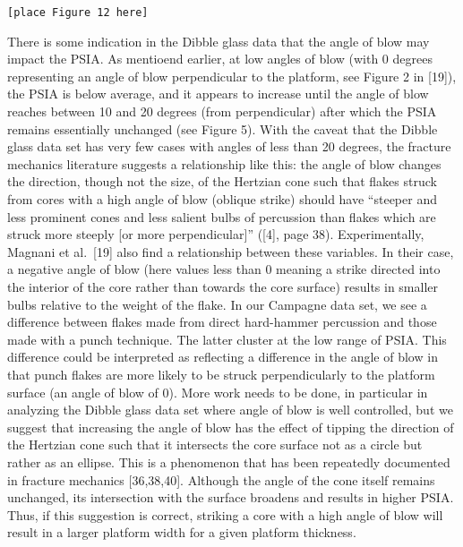 \documentclass[10pt,letterpaper]{article}
\begin{document}
\begin{verbatim}
[place Figure 12 here]
\end{verbatim}

There is some indication in the Dibble glass data that the angle of blow
may impact the PSIA. As mentioend earlier, at low angles of blow (with 0
degrees representing an angle of blow perpendicular to the platform, see
Figure 2 in {[}19{]}), the PSIA is below average, and it appears to
increase until the angle of blow reaches between 10 and 20 degrees (from
perpendicular) after which the PSIA remains essentially unchanged (see
Figure 5). With the caveat that the Dibble glass data set has very few
cases with angles of less than 20 degrees, the fracture mechanics
literature suggests a relationship like this: the angle of blow changes
the direction, though not the size, of the Hertzian cone such that
flakes struck from cores with a high angle of blow (oblique strike)
should have ``steeper and less prominent cones and less salient bulbs of
percussion than flakes which are struck more steeply {[}or more
perpendicular{]}'' ({[}4{]}, page 38). Experimentally, Magnani et
al.~{[}19{]} also find a relationship between these variables. In their
case, a negative angle of blow (here values less than 0 meaning a strike
directed into the interior of the core rather than towards the core
surface) results in smaller bulbs relative to the weight of the flake.
In our Campagne data set, we see a difference between flakes made from
direct hard-hammer percussion and those made with a punch technique. The
latter cluster at the low range of PSIA. This difference could be
interpreted as reflecting a difference in the angle of blow in that
punch flakes are more likely to be struck perpendicularly to the
platform surface (an angle of blow of 0). More work needs to be done, in
particular in analyzing the Dibble glass data set where angle of blow is
well controlled, but we suggest that increasing the angle of blow has
the effect of tipping the direction of the Hertzian cone such that it
intersects the core surface not as a circle but rather as an ellipse.
This is a phenomenon that has been repeatedly documented in fracture
mechanics {[}36,38,40{]}. Although the angle of the cone itself remains
unchanged, its intersection with the surface broadens and results in
higher PSIA. Thus, if this suggestion is correct, striking a core with a
high angle of blow will result in a larger platform width for a given
platform thickness.
\end{document}
